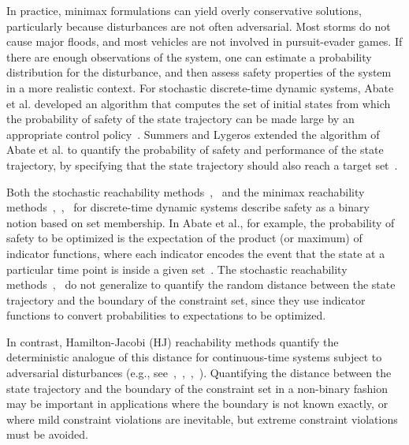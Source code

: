\documentclass[letterpaper, 10 pt, conference]{ieeeconf}  %
\begin{document}
In practice, minimax formulations can yield overly conservative solutions, particularly because disturbances are not often adversarial.
Most storms do not cause major floods, and most vehicles are not involved in pursuit-evader games.
If there are enough observations of the system, one can estimate a probability distribution
for the disturbance, and then assess safety properties of the system in a more realistic context.\footnotemark
{} 
For stochastic discrete-time dynamic systems, %
Abate et al. developed an algorithm that computes the set of initial states
from which the probability of safety of the state trajectory can be made large by an appropriate control policy~\cite{abate2008probabilistic}.\footnotemark
{} 
Summers and Lygeros extended the algorithm of Abate et al. to quantify the probability of safety and performance
of the state trajectory, by specifying that the state trajectory should also reach a target set~\cite{summers2010verification}.   

Both the stochastic reachability methods~\cite{abate2008probabilistic},~\cite{summers2010verification} and the minimax reachability methods~\cite{bertsekas1971control},~\cite{bertsekas1971minimax},~\cite{bertsekas2005dynamic} for discrete-time dynamic systems
describe safety as a binary notion based on set membership.
In Abate et al., for example, the probability of safety to be optimized is the expectation of the product (or maximum)
of indicator functions, where each indicator encodes the event that the state at a particular time point is inside a given set~\cite{abate2008probabilistic}.
The stochastic reachability methods~\cite{abate2008probabilistic},~\cite{summers2010verification} 
do not generalize to quantify the random distance between the state trajectory and the boundary of the constraint set,
since they use indicator functions to convert probabilities to expectations to be optimized.

In contrast, Hamilton-Jacobi (HJ) reachability methods quantify the deterministic analogue of this distance
for continuous-time systems subject to adversarial disturbances 
(e.g., see~\cite{bansal2017hamilton},~\cite{herbert2017fastrack},~\cite{EECS-2018-41},~\cite{mitchell2005toolbox}).
Quantifying the distance between the state trajectory and the boundary of the constraint set in a non-binary fashion
may be important in applications where the boundary is not known exactly,
or where mild constraint violations are inevitable, but extreme constraint violations must be avoided.
\end{document}
